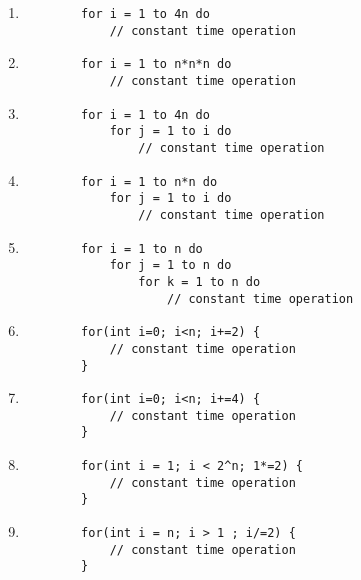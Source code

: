 \documentclass[11pt]{article}
\begin{document}
\begin{enumerate}[leftmargin=*]
        \begin{enumerate}
        \item
        \begin{verbatim}
        for i = 1 to 4n do
            // constant time operation
        \end{verbatim}
        \item
        \begin{verbatim}
        for i = 1 to n*n*n do
            // constant time operation
        \end{verbatim}
        \item
        \begin{verbatim}
        for i = 1 to 4n do
            for j = 1 to i do
                // constant time operation
        \end{verbatim}
        \item
        \begin{verbatim}
        for i = 1 to n*n do
            for j = 1 to i do
                // constant time operation
        \end{verbatim}
        \item
        \begin{verbatim}
        for i = 1 to n do
            for j = 1 to n do
                for k = 1 to n do
                    // constant time operation
        \end{verbatim}
        \item
        \begin{verbatim}
        for(int i=0; i<n; i+=2) {
            // constant time operation
        }
        \end{verbatim}
        \item
        \begin{verbatim}
        for(int i=0; i<n; i+=4) {
            // constant time operation
        }
        \end{verbatim}
        \item
        \begin{verbatim}
        for(int i = 1; i < 2^n; 1*=2) {
            // constant time operation
        }
        \end{verbatim}
        \item
        \begin{verbatim}
        for(int i = n; i > 1 ; i/=2) {
            // constant time operation
        }
        \end{verbatim}
        
    \end{enumerate}


\end{enumerate}
\end{document}
